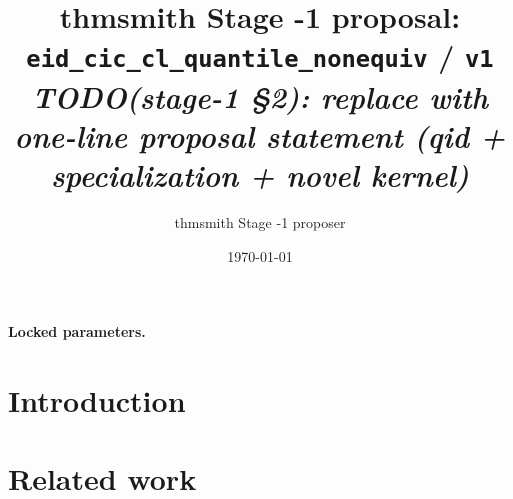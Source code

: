 \documentclass[11pt]{article}
\title{thmsmith Stage -1 proposal: \texttt{eid\_cic\_cl\_quantile\_nonequiv} / \texttt{v1}%
  \\ \large\textit{TODO(stage-1 \S2): replace with one-line proposal statement (qid + specialization + novel kernel)}}
\author{thmsmith Stage -1 proposer}
\date{\today}
\theoremstyle{definition}
\theoremstyle{plain}
\theoremstyle{remark}
\begin{document}
\maketitle


\paragraph{Locked parameters.}

\begin{abstract}
\end{abstract}

\section{Introduction}

\section{Related work}
\end{document}
